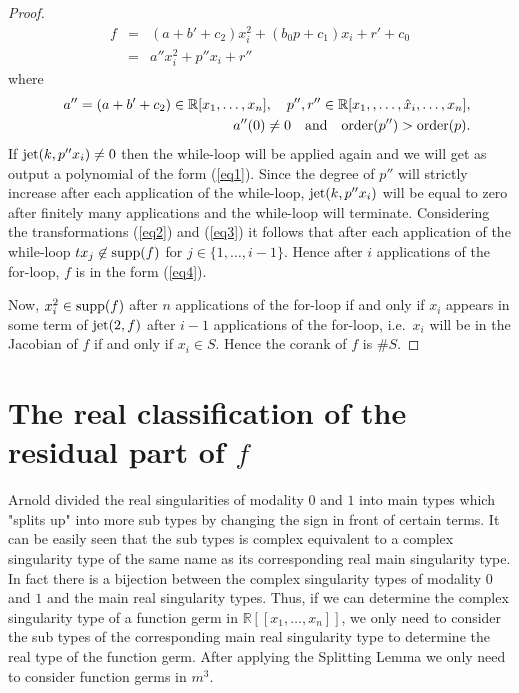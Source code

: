 \documentclass{amsproc}
\begin{document}
\begin{proof}
\begin{eqnarray}
f&=&(a+b'+c_2)x_i^2+(b_0p+c_1)x_i+r'+c_0\nonumber\\
&=&a''x_i^2+p''x_i+r''\label{eq1}
\end{eqnarray}
where
\begin{eqnarray*}
&&a'' = (a+b'+c_2)\in\mathbb R[x_1,\ldots,x_n],\quad p'',r''\in\mathbb R[x_1,,\ldots,\hat x_i,\ldots,x_n],\\ &&a''(0)\neq0\quad\textnormal{and}\quad\textnormal{order}(p'')>\textnormal{order}(p).
\end{eqnarray*}
If $\textnormal{jet}(k,p''x_i)\neq 0$ then the while-loop will be applied again and we will get as output a polynomial of the form (\ref{eq1}). Since the degree of $p''$ will strictly increase after each application of the while-loop, $\textnormal{jet}(k,p''x_i)$ will be equal to zero after finitely many applications and the while-loop will terminate. Considering the transformations  (\ref{eq2}) and (\ref{eq3}) it follows that after each application of the while-loop $tx_j\not\in\textnormal{supp}(f)$ for $j\in\{1,\ldots,i-1\}$. Hence after $i$ applications of the for-loop, $f$ is in the form (\ref{eq4}).

Now, $x_i^2\in\textnormal{supp}(f)$ after $n$ applications of the for-loop if and only if $x_i$ appears in some term of $\textnormal{jet}(2,f)$ after $i-1$ applications of the for-loop, i.e.~$x_i$ will be in the Jacobian of $f$ if and only if $x_i\in S$. Hence the corank of $f$ is $\#S$.
\end{proof}

\section{The real classification of the residual part of $f$}
Arnold divided the real singularities of modality $0$ and $1$ into main types which "splits up" into more sub types by changing the sign in front of certain terms. It can be easily seen that the sub types is complex equivalent to a complex singularity type of the same name as its corresponding real main singularity type. In fact there is a bijection between the complex singularity types of modality $0$ and $1$ and the main real singularity types. Thus, if we can determine the complex singularity type of a function germ in $\mathbb R[[x_1,\ldots,x_n]]$, we only need to consider the sub types of the corresponding main real singularity type to determine the real type of the function germ. After applying the Splitting Lemma we only need to consider function germs in $m^3$. 
\end{document}
